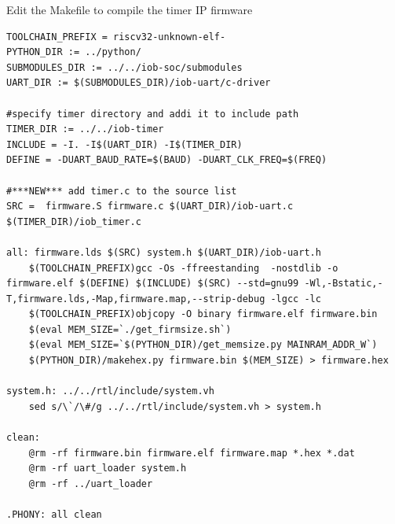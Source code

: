 \documentclass [xcolor=svgnames, t] {beamer}
\begin{document}
\begin{frame}[fragile]{Edit the Makefile to compile the timer IP firmware}
\begin{tiny}
\begin{lstlisting}
TOOLCHAIN_PREFIX = riscv32-unknown-elf-
PYTHON_DIR := ../python/
SUBMODULES_DIR := ../../iob-soc/submodules
UART_DIR := $(SUBMODULES_DIR)/iob-uart/c-driver

#specify timer directory and addi it to include path 
TIMER_DIR := ../../iob-timer
INCLUDE = -I. -I$(UART_DIR) -I$(TIMER_DIR)
DEFINE = -DUART_BAUD_RATE=$(BAUD) -DUART_CLK_FREQ=$(FREQ)

#***NEW*** add timer.c to the source list
SRC =  firmware.S firmware.c $(UART_DIR)/iob-uart.c  $(TIMER_DIR)/iob_timer.c

all: firmware.lds $(SRC) system.h $(UART_DIR)/iob-uart.h
	$(TOOLCHAIN_PREFIX)gcc -Os -ffreestanding  -nostdlib -o firmware.elf $(DEFINE) $(INCLUDE) $(SRC) --std=gnu99 -Wl,-Bstatic,-T,firmware.lds,-Map,firmware.map,--strip-debug -lgcc -lc
	$(TOOLCHAIN_PREFIX)objcopy -O binary firmware.elf firmware.bin
	$(eval MEM_SIZE=`./get_firmsize.sh`)
	$(eval MEM_SIZE=`$(PYTHON_DIR)/get_memsize.py MAINRAM_ADDR_W`)
	$(PYTHON_DIR)/makehex.py firmware.bin $(MEM_SIZE) > firmware.hex

system.h: ../../rtl/include/system.vh
	sed s/\`/\#/g ../../rtl/include/system.vh > system.h

clean:
	@rm -rf firmware.bin firmware.elf firmware.map *.hex *.dat
	@rm -rf uart_loader system.h
	@rm -rf ../uart_loader

.PHONY: all clean
\end{lstlisting}
\end{tiny}
\end{frame}
\end{document}
